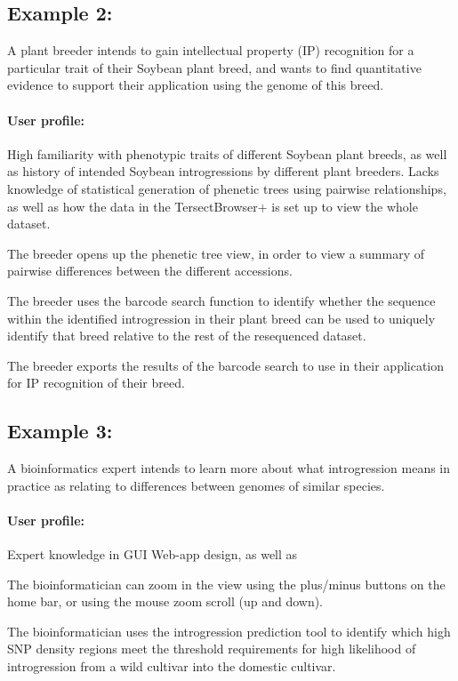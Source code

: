 \documentclass[12pt]{article}
\begin{document}
\subsection{Example 2:} A plant breeder intends to gain intellectual property (IP) recognition for a particular trait of their Soybean plant breed, and wants to find quantitative evidence to support their application using the genome of this breed. 

\paragraph{User profile:} High familiarity with phenotypic traits of different Soybean plant breeds, as well as history of intended Soybean introgressions by different plant breeders. Lacks knowledge of statistical generation of phenetic trees using pairwise relationships, as well as how the data in the TersectBrowser+ is set up to view the whole dataset. 

The breeder opens up the phenetic tree view, in order to view a summary of pairwise differences between the different accessions. 

The breeder uses the barcode search function to identify whether the sequence within the identified introgression in their plant breed can be used to uniquely identify that breed relative to the rest of the resequenced dataset. 

The breeder exports the results of the barcode search to use in their application for IP recognition of their breed. 

\subsection{Example 3:} A bioinformatics expert intends to learn more about what introgression means in practice as relating to differences between genomes of similar species. 

\paragraph{User profile:} Expert knowledge in GUI Web-app design, as well as  

The bioinformatician can zoom in the view using the plus/minus buttons on the home bar, or using the mouse zoom scroll (up and down). 

The bioinformatician uses the introgression prediction tool to identify which high SNP density regions meet the threshold requirements for high likelihood of introgression from a wild cultivar into the domestic cultivar. 
\end{document}
